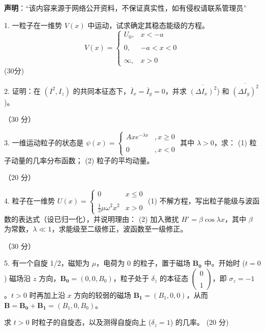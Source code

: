 
\textbf{声明}：“该内容来源于网络公开资料，不保证真实性，如有侵权请联系管理员”

1. 一粒子在一维势 \( V(x) \) 中运动，试求确定其稳态能级的方程。
$$V(x) = \begin{cases} U_0, & x < -a \\\\0, & -a < x < 0 \\\\\infty, & x > 0 \end{cases}~$$
(30分)

2. 证明：在 $\left( I^2, I_z \right)$ 的共同本征态下，$\overline{I}_x = \overline{I}_y = 0$，并求 $\overline{\left( \Delta I_x \right)^2}$) 和 $\overline{\left( \Delta I_y \right)^2}$)。

（30 分）

3. 一维运动粒子的状态是 $\psi(x) = \begin{cases} Axe^{-\lambda x} &, x \geq 0 \\\\0 & ,x < 0\end{cases}$
其中 $\lambda > 0$，求：
(1) 粒子动量的几率分布函数；
(2) 粒子的平均动量。

（20 分）

4. 粒子在一维势 $U(x) = \begin{cases} 0 & x \leq 0 \\\\ \frac{1}{2}\mu \omega^2 x^2 & x > 0 \end{cases}$
(1) 不解方程，写出粒子能级与波函数的表达式（设已归一化），并说明理由：
(2) 加入微扰 $H' = \beta \cos \lambda x$，其中 $\beta$ 为常数，$\lambda \ll 1$，求能级至二级修正，波函数至一级修正。

（30 分）

 5. 有一个自旋 1/2，磁矩为 $\mu$，电荷为 0 的粒子，置于磁场 $\mathbf{B_0}$ 中。开始时 ($t=0$) 磁场沿 $z$ 方向，$\mathbf{B_0} = (0, 0, B_0)$，粒子处于 $\delta_z$ 的本征态 $\begin{pmatrix} 0 \\\\ 1 \end{pmatrix}$，即 $σ_z = -1$。$t > 0$ 时再加上沿 $x$ 方向的较弱的磁场 $\mathbf{B_1} = (B_1, 0, 0)$，从而 $\mathbf{B} = \mathbf{B_0} + \mathbf{B_1} = (B_1, 0, B_0)$。

求 $t > 0$ 时粒子的自旋态，以及测得自旋向上 ($\delta_z = 1$) 的几率。 (20 分)

